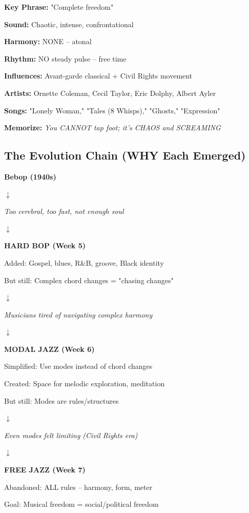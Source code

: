 \documentclass[11pt]{article}
\begin{document}
\begin{center}
\begin{tcolorbox}[colback=freejazz!10, colframe=freejazz, width=0.9\textwidth, title=\textbf{\Large Week 7: FREE JAZZ}]
\textbf{Key Phrase:} "Complete freedom"

\textbf{Sound:} \textcolor{freejazz}{Chaotic, intense, confrontational}

\textbf{Harmony:} NONE – atonal

\textbf{Rhythm:} NO steady pulse – free time

\textbf{Influences:} Avant-garde classical + Civil Rights movement

\textbf{Artists:} Ornette Coleman, Cecil Taylor, Eric Dolphy, Albert Ayler

\textbf{Songs:} "Lonely Woman," "Tales (8 Whisps)," "Ghosts," "Expression"

\textbf{Memorize:} \textit{You CANNOT tap foot; it's CHAOS and SCREAMING}
\end{tcolorbox}
\end{center}

\newpage

\subsection*{The Evolution Chain (WHY Each Emerged)}

\begin{center}
\begin{tcolorbox}[colback=gray!10, colframe=black, width=0.95\textwidth]
\textbf{\Large Bebop (1940s)}

$\downarrow$

\textit{Too cerebral, too fast, not enough soul}

$\downarrow$

\textbf{\Large \textcolor{hardbop}{HARD BOP (Week 5)}}

Added: Gospel, blues, R\&B, groove, Black identity

But still: Complex chord changes = "chasing changes"

$\downarrow$

\textit{Musicians tired of navigating complex harmony}

$\downarrow$

\textbf{\Large \textcolor{modal}{MODAL JAZZ (Week 6)}}

Simplified: Use modes instead of chord changes

Created: Space for melodic exploration, meditation

But still: Modes are rules/structures

$\downarrow$

\textit{Even modes felt limiting (Civil Rights era)}

$\downarrow$

\textbf{\Large \textcolor{freejazz}{FREE JAZZ (Week 7)}}

Abandoned: ALL rules – harmony, form, meter

Goal: Musical freedom = social/political freedom
\end{tcolorbox}
\end{center}
\end{document}

